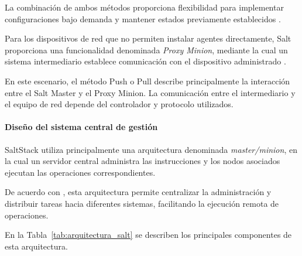 \documentclass[12pt,a4paper]{article}
\begin{document}
La combinación de ambos métodos proporciona flexibilidad
para implementar configuraciones bajo demanda y mantener
estados previamente establecidos
\parencite{myers2015saltstack,salt_user_guide}.

Para los dispositivos de red que no permiten instalar agentes
directamente, Salt proporciona una funcionalidad denominada
\textit{Proxy Minion}, mediante la cual un sistema intermediario
establece comunicación con el dispositivo administrado
\parencite{salt_napalm_proxy}.

En este escenario, el método Push o Pull describe principalmente
la interacción entre el Salt Master y el Proxy Minion. La
comunicación entre el intermediario y el equipo de red depende
del controlador y protocolo utilizados.


\paragraph{Diseño del sistema central de gestión}

SaltStack utiliza principalmente una arquitectura denominada
\textit{master/minion}, en la cual un servidor central administra
las instrucciones y los nodos asociados ejecutan las operaciones
correspondientes.

De acuerdo con \textcite{myers2015saltstack}, esta arquitectura
permite centralizar la administración y distribuir tareas hacia
diferentes sistemas, facilitando la ejecución remota de
operaciones.

En la Tabla~\ref{tab:arquitectura_salt} se describen los
principales componentes de esta arquitectura.
\end{document}
